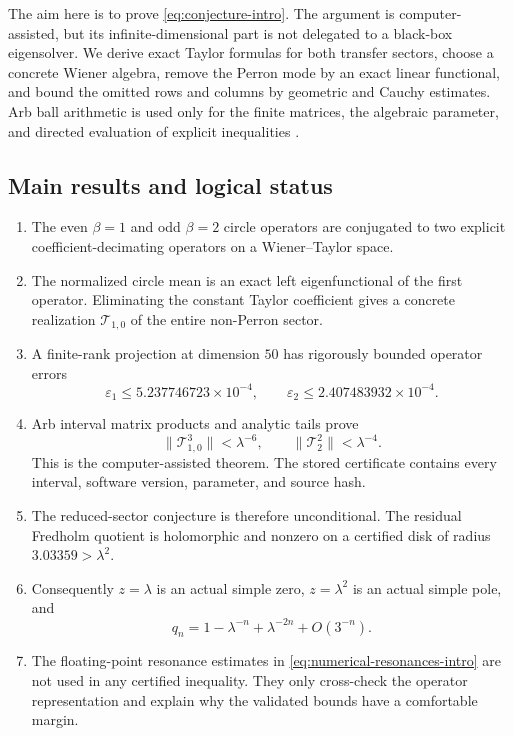 \documentclass[11pt]{article}
\theoremstyle{definition}
\theoremstyle{remark}
\newcommand{\cT}{\mathcal T}
\begin{document}
The aim here is to prove \eqref{eq:conjecture-intro}.  The argument is
computer-assisted, but its infinite-dimensional part is not delegated to a
black-box eigensolver.  We derive exact Taylor formulas for both transfer
sectors, choose a concrete Wiener algebra, remove the Perron mode by an exact
linear functional, and bound the omitted rows and columns by geometric and
Cauchy estimates.  Arb ball arithmetic is used only for the finite matrices,
the algebraic parameter, and directed evaluation of explicit inequalities
\citep{Johansson2017}.

\subsection*{Main results and logical status}

\begin{enumerate}[label=\textbf{R\arabic*.},leftmargin=3.2em]
 \item The even $\beta=1$ and odd $\beta=2$ circle operators are conjugated
 to two explicit coefficient-decimating operators on a Wiener--Taylor space.

 \item The normalized circle mean is an exact left eigenfunctional of the
 first operator.  Eliminating the constant Taylor coefficient gives a
 concrete realization $\cT_{1,0}$ of the entire non-Perron sector.

 \item A finite-rank projection at dimension $50$ has rigorously bounded
 operator errors
 \[
  \varepsilon_1\le5.237746723\times10^{-4},
  \qquad
  \varepsilon_2\le2.407483932\times10^{-4}.
 \]

 \item Arb interval matrix products and analytic tails prove
 \[
  \|\cT_{1,0}^3\|<\lambda^{-6},
  \qquad
  \|\cT_2^2\|<\lambda^{-4}.
 \]
 This is the computer-assisted theorem.  The stored certificate contains
 every interval, software version, parameter, and source hash.

 \item The reduced-sector conjecture is therefore unconditional.  The
 residual Fredholm quotient is holomorphic and nonzero on a certified disk
 of radius $3.03359>\lambda^2$.

 \item Consequently $z=\lambda$ is an actual simple zero,
 $z=\lambda^2$ is an actual simple pole, and
 \[
  q_n=1-\lambda^{-n}+\lambda^{-2n}+O(3^{-n}).
 \]

 \item The floating-point resonance estimates in
 \eqref{eq:numerical-resonances-intro} are not used in any certified
 inequality.  They only cross-check the operator representation and explain
 why the validated bounds have a comfortable margin.
\end{enumerate}
\end{document}
